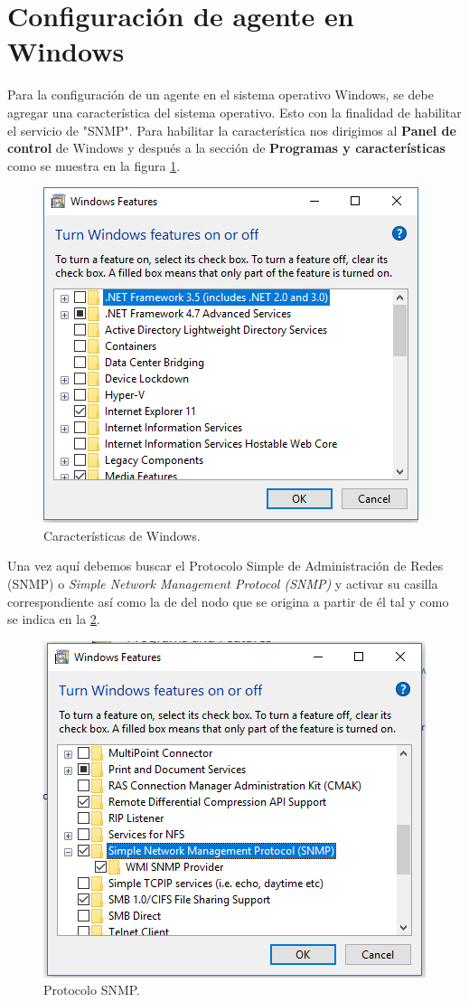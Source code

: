 \section{Configuración de agente en Windows}
Para la configuración de un agente en el sistema operativo Windows, se debe agregar una característica del sistema operativo. Esto con la finalidad de habilitar el servicio de "SNMP". Para habilitar la característica nos dirigimos al \textbf{Panel de control} de Windows y después a la sección de \textbf{Programas y características} como se muestra en la figura \ref{image:car}.

\FloatBarrier
\begin{figure}[htbp!]
		\centering
			\includegraphics[width=.5 \textwidth]{images/progsycar}
		\caption{Características de Windows.}
		\label{image:car}
\end{figure}
\FloatBarrier

Una vez aquí debemos buscar el Protocolo Simple de Administración de Redes (SNMP) o \textit{Simple Network Management Protocol (SNMP)} y activar su casilla correspondiente así como la de del nodo que se origina a partir de él tal y como se indica en la \ref{image:snmpcar}.

\FloatBarrier
\begin{figure}[htbp!]
		\centering
			\includegraphics[width=.5 \textwidth]{images/snmpCar}
		\caption{Protocolo SNMP.}
		\label{image:snmpcar}
\end{figure}
\FloatBarrier

